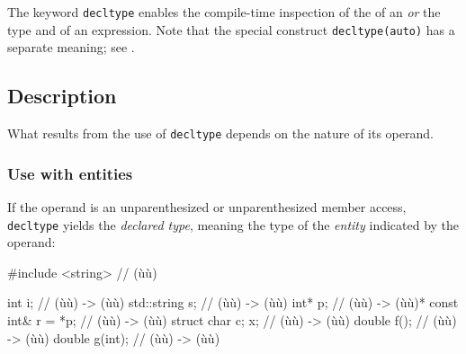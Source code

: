 
The keyword \lstinline!decltype! enables the compile-time inspection of the  of an  \emph{or} the type and
 of an expression. Note that the special construct \lstinline!decltype(auto)! has a separate meaning; see .

\subsection[Description]{Description}\label{description}

What results from the use of \lstinline!decltype! depends on the nature of
its operand.

\subsubsection[Use with entities]{Use with entities}\label{use-with-(typically-named)-entities}

If the operand is an unparenthesized  or unparenthesized member access, \lstinline!decltype! yields the \emph{declared type}, meaning the type of the \emph{entity} indicated by the operand:


\begin{emcppshiddenlisting}[emcppsbatch=e1]
#include <string>  // (ù{}ù)
\end{emcppshiddenlisting}
\begin{emcppslisting}[emcppsbatch=e1]
int i;                // (ù{}ù)   -> (ù{}ù)
std::string s;        // (ù{}ù)   -> (ù{}ù)
int* p;               // (ù{}ù)   -> (ù{}ù)*
const int& r = *p;    // (ù{}ù)   -> (ù{}ù)
struct { char c; } x; // (ù{}ù) -> (ù{}ù)
double f();           // (ù{}ù)   -> (ù{}ù)
double g(int);        // (ù{}ù)   -> (ù{}ù)
\end{emcppslisting}


